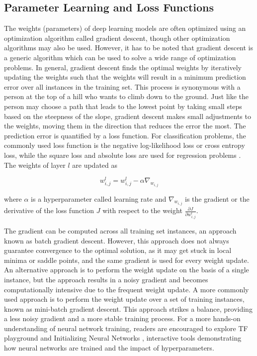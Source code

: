 \documentclass[preprint,12pt]{elsarticle}
\begin{document}
\subsection{Parameter Learning and Loss Functions}
The weights (parameters) of deep learning models are often optimized using an optimization algorithm called gradient descent, though other optimization algorithms may also be used. However, it has to be noted that gradient descent is a generic algorithm which can be used to solve a wide range of optimization problems. In general, gradient descent finds the optimal weights by iteratively updating the weights such that the weights will result in a minimum prediction error over all instances in the training set. This process is synonymous with a person at the top of a hill who wants to climb down to the ground. Just like the person may choose a path that leads to the lowest point by taking small steps based on the steepness of the slope, gradient descent makes small adjustments to the weights, moving them in the direction that reduces the error the most. The prediction error is quantified by a loss function. For classification problems, the commonly used loss function is the negative log-likelihood loss or cross entropy loss, while the square loss and absolute loss are used for regression problems \citep{wang_comprehensive_2022}. The weights of layer $l$ are updated as

\begin{equation}
{w_{i,j}^l = w_{i,j}^l - \alpha \nabla_{w_{i,j}}}
\end{equation}

\noindent where $\alpha$ is a hyperparameter called learning rate and $\nabla_{w_{i,j}}$ is the gradient or the derivative of the loss function $J$ with respect to the weight $\frac{\partial J}{\partial w_{i,j}^l}$.

The gradient can be computed across all training set instances, an approach known as batch gradient descent. However, this approach does not always guarantee convergence to the optimal solution, as it may get stuck in local minima or saddle points, and the same gradient is used for every weight update. An alternative approach is to perform the weight update on the basis of a single instance, but the approach results in a noisy gradient and becomes computationally intensive due to the frequent weight update. A more commonly used approach is to perform the weight update over a set of training instances, known as mini-batch gradient descent. This approach strikes a balance, providing a less noisy gradient and a more stable training process. For a more hands-on understanding of neural network training, readers are encouraged to explore TF playground \citep{carter_tensorflow_nodate} and Initializing Neural Networks \citep{guo_ai_nodate}, interactive tools demonstrating how neural networks are trained and the impact of hyperparameters.
\end{document}

